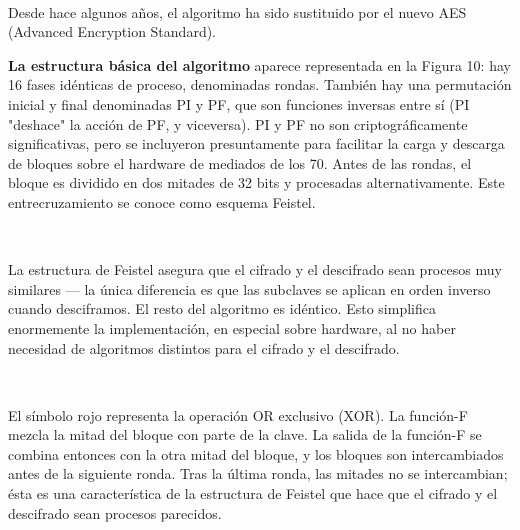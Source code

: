 \documentclass[11pt, conference]{IEEEtran}
\begin{document}
\

Desde hace algunos años, el algoritmo ha sido sustituido por el nuevo AES (Advanced Encryption Standard).

\textbf{La estructura básica del algoritmo}  aparece representada en la Figura 10: hay 16 fases idénticas de proceso, denominadas rondas. También hay una permutación inicial y final denominadas PI y PF, que son funciones inversas entre sí (PI "deshace" la acción de PF, y viceversa). PI y PF no son criptográficamente significativas, pero se incluyeron presuntamente para facilitar la carga y descarga de bloques sobre el hardware de mediados de los 70. Antes de las rondas, el bloque es dividido en dos mitades de 32 bits y procesadas alternativamente. Este entrecruzamiento se conoce como esquema Feistel.

\

La estructura de Feistel asegura que el cifrado y el descifrado sean procesos muy similares — la única diferencia es que las subclaves se aplican en orden inverso cuando desciframos. El resto del algoritmo es idéntico. Esto simplifica enormemente la implementación, en especial sobre hardware, al no haber necesidad de algoritmos distintos para el cifrado y el descifrado.

\

El símbolo rojo  representa la operación OR exclusivo (XOR). La función-F mezcla la mitad del bloque con parte de la clave. La salida de la función-F se combina entonces con la otra mitad del bloque, y los bloques son intercambiados antes de la siguiente ronda. Tras la última ronda, las mitades no se intercambian; ésta es una característica de la estructura de Feistel que hace que el cifrado y el descifrado sean procesos parecidos.
\end{document}
